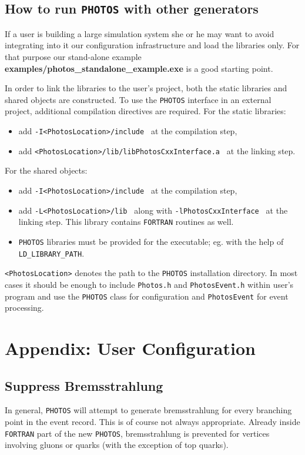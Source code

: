 \documentclass[]{Photos_interface_design}
\begin{document}
\subsection{How to run {\tt PHOTOS} with other generators}
If a user is building a large simulation system she or he may want to avoid
integrating into it our configuration infrastructure and load the libraries only. 
For that purpose our stand-alone 
example {\bf examples/photos\_standalone\_example.exe} is a good starting point.

In order to link the libraries to the user's project, both the static libraries and shared objects are
constructed. To use the {\tt PHOTOS} interface in an external project, additional 
compilation directives are required. For the static libraries:
\begin{itemize}
  \item add {\tt -I<PhotosLocation>/include } at the compilation step,
  \item add {\tt <PhotosLocation>/lib/libPhotosCxxInterface.a } at the linking step.
\end{itemize}
For the shared objects:
\begin{itemize}
  \item add {\tt -I<PhotosLocation>/include } at the compilation step,
  \item add {\tt -L<PhotosLocation>/lib } along with {\tt -lPhotosCxxInterface } at the linking step.
        This library contains {\tt FORTRAN} routines as well.
  \item  {\tt PHOTOS} libraries must be provided for the executable; eg. with the help of {\tt LD\_LIBRARY\_PATH}.
\end{itemize}
{\tt <PhotosLocation>} denotes the path to the {\tt PHOTOS} installation directory.
In most cases it should be enough to include {\tt Photos.h} and {\tt PhotosEvent.h}
within user's program and use the {\tt PHOTOS} class for configuration and {\tt PhotosEvent}
for event processing.

\section{Appendix: User Configuration}
\label{sec:User Configuration}

\subsection{Suppress Bremsstrahlung}
\label{section:suppress}

In general, {\tt PHOTOS} will attempt to generate bremsstrahlung for every 
branching point in the event record. This is of course not always appropriate.
Already inside {\tt FORTRAN} part of the new {\tt PHOTOS}, bremsstrahlung is prevented for vertices involving gluons or quarks 
(with the exception of top quarks).
\end{document}
